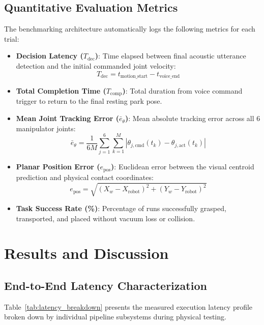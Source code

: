 \documentclass[runningheads]{llncs}
\begin{document}
\subsection{Quantitative Evaluation Metrics}
The benchmarking architecture automatically logs the following metrics for each trial:
\begin{itemize}
    \item \textbf{Decision Latency ($T_{\text{dec}}$)}: Time elapsed between final acoustic utterance detection and the initial commanded joint velocity:
    \begin{equation}
        T_{\text{dec}} = t_{\text{motion\_start}} - t_{\text{voice\_end}}
    \end{equation}
    \item \textbf{Total Completion Time ($T_{\text{comp}}$)}: Total duration from voice command trigger to return to the final resting park pose.
    \item \textbf{Mean Joint Tracking Error ($\bar{e}_\theta$)}: Mean absolute tracking error across all 6 manipulator joints:
    \begin{equation}
        \bar{e}_\theta = \frac{1}{6 M} \sum_{j=1}^6 \sum_{k=1}^M \left| \theta_{j,\text{cmd}}(t_k) - \theta_{j,\text{act}}(t_k) \right|
    \end{equation}
    \item \textbf{Planar Position Error ($e_{\text{pos}}$)}: Euclidean error between the visual centroid prediction and physical contact coordinates:
    \begin{equation}
        e_{\text{pos}} = \sqrt{(X_w - X_{\text{robot}})^2 + (Y_w - Y_{\text{robot}})^2}
    \end{equation}
    \item \textbf{Task Success Rate (\%)}: Percentage of runs successfully grasped, transported, and placed without vacuum loss or collision.
\end{itemize}

\section{Results and Discussion}
\label{sec:results}

\subsection{End-to-End Latency Characterization}
Table~\ref{tab:latency_breakdown} presents the measured execution latency profile broken down by individual pipeline subsystems during physical testing.
\end{document}
